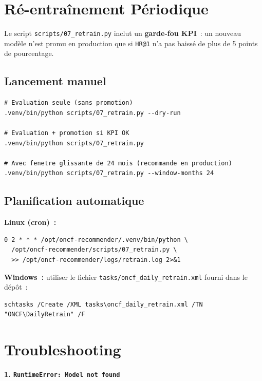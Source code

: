 \documentclass[12pt, a4paper]{report}
\begin{document}
\section{Ré-entraînement Périodique}

Le script \texttt{scripts/07\_retrain.py} inclut un \textbf{garde-fou KPI}~:
un nouveau modèle n'est promu en production que si \texttt{HR@1} n'a pas
baissé de plus de 5 points de pourcentage.

\subsection{Lancement manuel}

\begin{lstlisting}[style=bash]
# Evaluation seule (sans promotion)
.venv/bin/python scripts/07_retrain.py --dry-run

# Evaluation + promotion si KPI OK
.venv/bin/python scripts/07_retrain.py

# Avec fenetre glissante de 24 mois (recommande en production)
.venv/bin/python scripts/07_retrain.py --window-months 24
\end{lstlisting}

\subsection{Planification automatique}

\textbf{Linux (cron)~:}
\begin{lstlisting}[style=bash]
0 2 * * * /opt/oncf-recommender/.venv/bin/python \
  /opt/oncf-recommender/scripts/07_retrain.py \
  >> /opt/oncf-recommender/logs/retrain.log 2>&1
\end{lstlisting}

\textbf{Windows~:} utiliser le fichier \texttt{tasks/oncf\_daily\_retrain.xml}
fourni dans le dépôt~:
\begin{lstlisting}[style=bash]
schtasks /Create /XML tasks\oncf_daily_retrain.xml /TN "ONCF\DailyRetrain" /F
\end{lstlisting}

\section{Troubleshooting}

\textbf{1. \texttt{RuntimeError: Model not found}}
\end{document}
